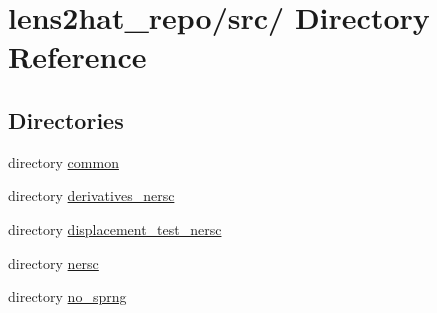 \section{lens2hat\-\_\-repo/src/ Directory Reference}
\label{dir_c24a4ff7dc56f333cdcde7775738ef0f}
\subsection*{Directories}
\begin{DoxyCompactItemize}
\item 
directory \hyperlink{dir_d99042e9449d4a45ab9103cb51e01429}{common}
\item 
directory \hyperlink{dir_d6736cdd7e51a1a2d59bc4797c9e5b53}{derivatives\-\_\-nersc}
\item 
directory \hyperlink{dir_d7d065e17e0da2dff133728a1da14cc0}{displacement\-\_\-test\-\_\-nersc}
\item 
directory \hyperlink{dir_8fef260a2096467668e67e0165d48090}{nersc}
\item 
directory \hyperlink{dir_c065d4977ebcbdfd3146c4237da90c7e}{no\-\_\-sprng}
\end{DoxyCompactItemize}
